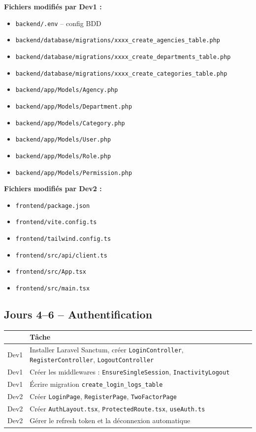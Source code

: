 \documentclass[12pt,a4paper]{report}
\begin{document}
\textbf{Fichiers modifiés par Dev1 :}
\begin{itemize}
    \item \texttt{backend/.env} -- config BDD
    \item \texttt{backend/database/migrations/xxxx\_create\_agencies\_table.php}
    \item \texttt{backend/database/migrations/xxxx\_create\_departments\_table.php}
    \item \texttt{backend/database/migrations/xxxx\_create\_categories\_table.php}
    \item \texttt{backend/app/Models/Agency.php}
    \item \texttt{backend/app/Models/Department.php}
    \item \texttt{backend/app/Models/Category.php}
    \item \texttt{backend/app/Models/User.php}
    \item \texttt{backend/app/Models/Role.php}
    \item \texttt{backend/app/Models/Permission.php}
\end{itemize}

\textbf{Fichiers modifiés par Dev2 :}
\begin{itemize}
    \item \texttt{frontend/package.json}
    \item \texttt{frontend/vite.config.ts}
    \item \texttt{frontend/tailwind.config.ts}
    \item \texttt{frontend/src/api/client.ts}
    \item \texttt{frontend/src/App.tsx}
    \item \texttt{frontend/src/main.tsx}
\end{itemize}

\newpage
\subsection*{Jours 4--6 -- Authentification}

\begin{tabularx}{\textwidth}{l X}
    \toprule
    & \textbf{Tâche} \\
    \midrule
    Dev1 & Installer Laravel Sanctum, créer \texttt{LoginController}, \texttt{RegisterController}, \texttt{LogoutController} \\
    Dev1 & Créer les middlewares : \texttt{EnsureSingleSession}, \texttt{InactivityLogout} \\
    Dev1 & Écrire migration \texttt{create\_login\_logs\_table} \\
    Dev2 & Créer \texttt{LoginPage}, \texttt{RegisterPage}, \texttt{TwoFactorPage} \\
    Dev2 & Créer \texttt{AuthLayout.tsx}, \texttt{ProtectedRoute.tsx}, \texttt{useAuth.ts} \\
    Dev2 & Gérer le refresh token et la déconnexion automatique \\
    \bottomrule
\end{tabularx}
\end{document}
